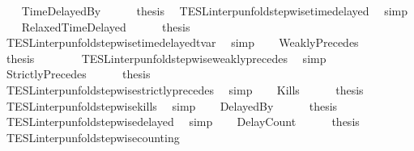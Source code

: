 \begin{isabellebody}
\isanewline
\ \ \isamarkupfalse%
\ TimeDelayedBy\isanewline
\ \ \ \ \isamarkupfalse%
\ {\isacharquery}thesis\ \isamarkupfalse%
\ TESL{\isacharunderscore}interp{\isacharunderscore}unfold{\isacharunderscore}stepwise{\isacharunderscore}timedelayed\ \isamarkupfalse%
\ simp\isanewline
{}\isamarkupfalse%
\isanewline
\ \ \isamarkupfalse%
\ RelaxedTimeDelayed\isanewline
\ \ \ \ \isamarkupfalse%
\ {\isacharquery}thesis\ \isamarkupfalse%
\ TESL{\isacharunderscore}interp{\isacharunderscore}unfold{\isacharunderscore}stepwise{\isacharunderscore}timedelayed{\isacharunderscore}tvar\ \isamarkupfalse%
\ simp\isanewline
{}\isamarkupfalse%
\isanewline
\ \ \isamarkupfalse%
\ WeaklyPrecedes\isanewline
\ \ \ \ \isamarkupfalse%
\ {\isacharquery}thesis\isanewline
\ \ \ \ \ \ \isamarkupfalse%
\ TESL{\isacharunderscore}interp{\isacharunderscore}unfold{\isacharunderscore}stepwise{\isacharunderscore}weakly{\isacharunderscore}precedes\ \isamarkupfalse%
\ simp\isanewline
{}\isamarkupfalse%
\isanewline
\ \ \isamarkupfalse%
\ StrictlyPrecedes\isanewline
\ \ \ \ \isamarkupfalse%
\ {\isacharquery}thesis\isanewline
\ \ \ \ \ \ \isamarkupfalse%
\ TESL{\isacharunderscore}interp{\isacharunderscore}unfold{\isacharunderscore}stepwise{\isacharunderscore}strictly{\isacharunderscore}precedes\ \isamarkupfalse%
\ simp\isanewline
{}\isamarkupfalse%
\isanewline
\ \ \isamarkupfalse%
\ Kills\isanewline
\ \ \ \ \isamarkupfalse%
\ {\isacharquery}thesis\isanewline
\ \ \ \ \ \ \isamarkupfalse%
\ TESL{\isacharunderscore}interp{\isacharunderscore}unfold{\isacharunderscore}stepwise{\isacharunderscore}kills\ \isamarkupfalse%
\ simp\isanewline
{}\isamarkupfalse%
\isanewline
\ \ \isamarkupfalse%
\ DelayedBy\isanewline
\ \ \ \ \isamarkupfalse%
\ {\isacharquery}thesis\ \isamarkupfalse%
\ TESL{\isacharunderscore}interp{\isacharunderscore}unfold{\isacharunderscore}stepwise{\isacharunderscore}delayed\ \isamarkupfalse%
\ simp\isanewline
{}\isamarkupfalse%
\isanewline
\ \ \isamarkupfalse%
\ DelayCount\isanewline
\ \ \ \ \isamarkupfalse%
\ {\isacharquery}thesis\ \isamarkupfalse%
\ TESL{\isacharunderscore}interp{\isacharunderscore}unfold{\isacharunderscore}stepwise{\isacharunderscore}counting\ \isamarkupfalse%

\end{isabellebody}
